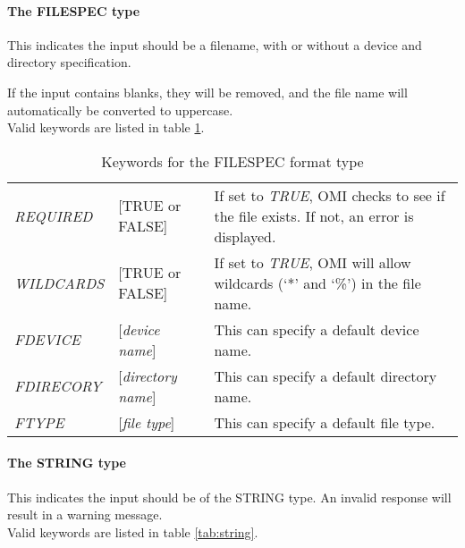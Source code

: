 \documentclass[a4paper]{book}
\begin{document}
\paragraph{The FILESPEC type}

This indicates the input should be a filename, with or without a device and 
directory specification.

If the input contains blanks, they will be removed, and the file name will 
automatically be converted to uppercase. \\
Valid keywords are listed in table \ref{tab:filespec}.

\begin{table}[ht]
\begin{minipage}[t]{\textwidth}
\begin{tabular}{llp{6cm}} \hline
\textsl{REQUIRED} & [\textsf{TRUE} or \textsf{FALSE}] & If set to \textsl{TRUE}, OMI checks to see if the file exists. If not, an error is displayed.\\
\textsl{WILDCARDS} & [\textsf{TRUE} or \textsf{FALSE}] & If set to \textsl{TRUE}, OMI will allow wildcards (`*' and `\%') in the file name.\\
\textsl{FDEVICE} & [\textit{device name}] & This can specify a default device name. \\
\textsl{FDIRECORY} & [\textit{directory name}] & This can specify a default directory name. \\
\textsl{FTYPE} & [\textit{file type}] & This can specify a default file type. \\ \hline
\end{tabular}
\caption{Keywords for the FILESPEC format type}\label{tab:filespec}
\end{minipage}
\end{table}

\paragraph{The STRING type}

This indicates the input should be of the \textsf{STRING} 
type. An invalid response will 
result in a warning message. \\
Valid keywords are listed in table \ref{tab:string}.
\end{document}
